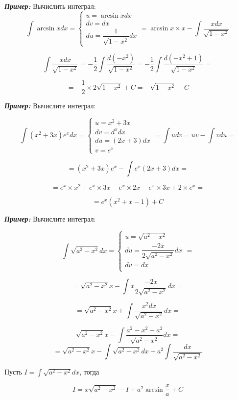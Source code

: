 \documentclass[a4paper,12pt]{article}
\theoremstyle{plain} %
\theoremstyle{definition} %
\theoremstyle{remark} %
\begin{document}
\textit{\textbf{Пример:}} Вычислить интеграл:
\[ \int \arcsin{x} dx =
	\begin{cases}
		u = \arcsin{x} dx \\
		dv = dx           \\
		du = \dfrac{1}{\sqrt{1 - x^2}} dx
	\end{cases} = \arcsin{x} \times x - \int \frac{xdx}{\sqrt{1 - x^2}}
\]

\[
	\int \frac{x dx}{\sqrt{1 - x^2}} = - \frac{1}{2} \int \frac{d(-x^2)}{\sqrt{1 - x^2}} = - \frac{1}{2} \int \frac{d(-x^2 + 1)}{\sqrt{1 - x^2}} =
\]

\[ = - \frac{1}{2} \times 2 \sqrt{1 - x^2} + C = -\sqrt{1 - x^2} + C \]

\textit{\textbf{Пример:}} Вычислите интеграл:

\[
	\int (x^2 + 3x) e^x dx =
	\begin{cases}
		u = x^2 + 3x    \\
		dv = d^xdx      \\
		du = (2x + 3)dx \\
		v = e^x
	\end{cases} =
	\int udv = uv - \int vdu =
\]

\[
	= (x^2 + 3x)e^x - \int e^x (2x + 3) dx =
\]

\[ = e^x \times x^2 + e^x \times 3x - e^x \times 2x - e^x \times 3x + 2 \times e^x =
\]

\[
	= e^x (x^2 + x - 1) + C
\]

\textit{\textbf{Пример:}} Вычислите интеграл:

\[
	\int \sqrt{a^2 - x^2}dx =
	\begin{cases}
		u = \sqrt{a^2 - x^2}                   \\
		du = \dfrac{-2x}{2\sqrt{a^2 - x^2}} dx \\
		dv = dx                                \\
	\end{cases}
	=
\]

\[ = \sqrt{a^2 - x^2}x - \int x \dfrac{-2x}{2\sqrt{a^2 - x^2}} dx =
\]

\[
	= \sqrt{a^2 - x^2}x + \int \frac{x^2 dx}{\sqrt{a^2 - x^2}} dx =
\]

\[ \sqrt{a^2 - x^2}x - \int \frac{a^2 - x^2 - a^2}{\sqrt{a^2 - x^2}} dx =
\]
\[
	= \sqrt{a^2 - x^2}x - \int \sqrt{a^2 - x^2}dx + a^2 \int \frac{dx}{\sqrt{a^2 - x^2}}
\]

Пусть $ I = \int \sqrt{a^2 - x^2}dx $, тогда

\[
	I = x \sqrt{a^2 - x^2} - I + a^2 \arcsin{\frac{x}{a}} + C
\]
\end{document}

